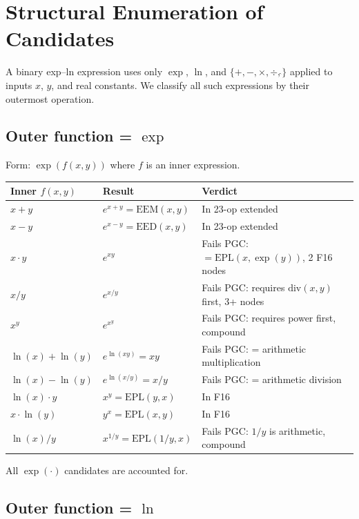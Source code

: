 \documentclass[11pt]{article}
\begin{document}
\section{Structural Enumeration of Candidates}

A binary exp--ln expression uses only $\exp$, $\ln$, and $\{+,-,\times,\div,\hat{}\}$
applied to inputs $x$, $y$, and real constants.
We classify all such expressions by their outermost operation.

\subsection{Outer function = $\exp$}

Form: $\exp(f(x,y))$ where $f$ is an inner expression.

\begin{center}
\renewcommand{\arraystretch}{1.2}
\begin{tabular}{lll}
\toprule
Inner $f(x,y)$ & Result & Verdict \\
\midrule
$x + y$ & $e^{x+y} = \mathrm{EEM}(x,y)$ & In 23-op extended \\
$x - y$ & $e^{x-y} = \mathrm{EED}(x,y)$ & In 23-op extended \\
$x \cdot y$ & $e^{xy}$ & Fails PGC: $= \mathrm{EPL}(x, \exp(y))$, 2 F16 nodes \\
$x / y$ & $e^{x/y}$ & Fails PGC: requires $\mathrm{div}(x,y)$ first, 3+ nodes \\
$x^y$ & $e^{x^y}$ & Fails PGC: requires power first, compound \\
$\ln(x) + \ln(y)$ & $e^{\ln(xy)} = xy$ & Fails PGC: = arithmetic multiplication \\
$\ln(x) - \ln(y)$ & $e^{\ln(x/y)} = x/y$ & Fails PGC: = arithmetic division \\
$\ln(x) \cdot y$ & $x^y = \mathrm{EPL}(y,x)$ & In F16 \\
$x \cdot \ln(y)$ & $y^x = \mathrm{EPL}(x,y)$ & In F16 \\
$\ln(x) / y$ & $x^{1/y} = \mathrm{EPL}(1/y, x)$ & Fails PGC: $1/y$ is arithmetic, compound \\
\bottomrule
\end{tabular}
\end{center}

All $\exp(\cdot)$ candidates are accounted for.

\subsection{Outer function = $\ln$}
\end{document}

